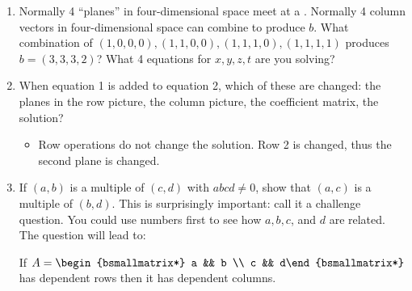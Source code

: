 \begin{itemize}
\begin{enumerate}[resume]
    \item Normally 4 ``planes'' in four-dimensional space meet at a . Normally 4
      column vectors in four-dimensional space can combine to produce \(b\). What
      combination of \( (1,0,0,0), (1,1,0,0), (1,1,1,0), (1,1,1,1) \) produces \(b =
      (3,3,3,2)\)?  What 4 equations for \(x, y, z, t\)
      are you solving? 
      \fg{\[
        \begin{bmatrix}[cccc|c]
          1 & 0 & 0 & 0 & 3 \\
          1 & 1 & 0 & 0 & 3 \\
          1 & 1 & 1 & 0 & 3 \\
          1 & 1 & 1 & 1 & 1
        \end{bmatrix}
      \]}

    \item When equation 1 is added to equation 2, which of these are changed:
      the planes in the row picture, the column picture, the coefficient
      matrix, the solution?
      \begin{itemize}\color{foreground}
        \item Row operations do not change the solution. Row 2 is changed, thus
          the second plane is changed. 
      \end{itemize}

      \newpage
    \item  If \((a,b)\) is a multiple of \((c,d)\) with \(abcd \neq 0\), show
      that \((a,c)\) is a multiple of \((b,d)\). This is surprisingly
      important: call it a challenge question. You could use numbers first to
      see how \(a, b, c\), and \(d\) are related. The question will lead to:

      If \(A = \begin{bsmallmatrix*} a && b \\ c && d\end{bsmallmatrix*}\)  has
      dependent rows then it has dependent columns.

      \vspace{25pt}


\end{enumerate}
\end{itemize}
